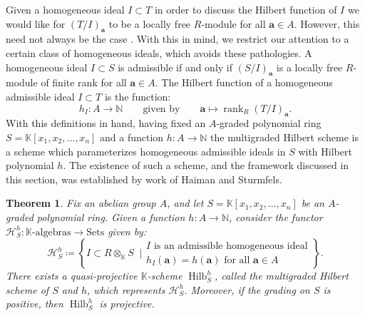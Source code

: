 \documentclass[11pt,reqno]{amsart}
\newtheorem{theorem}[lemma]{Theorem}
\newtheorem{defn}[lemma]{Definition}
\theoremstyle{remark}
\newtheorem{example}[lemma]{Example}
\newcommand{\Hilb}{\operatorname{Hilb}}
\newcommand{\rank}{\operatorname{rank}}
\renewcommand{\aa}{\mathbf a}
\newcommand{\cH}{\mathcal{H}}
\newcommand{\C}{\mathbb{C}}
\newcommand{\K}{\mathbb{K}}
\newcommand{\N}{\mathbb{N}}
\newcommand{\juliette}[1]{{\color{red} \sf $\spadesuit\spadesuit\spadesuit$ Juliette: [#1]}}
\begin{document}
Given a homogeneous ideal $I\subset T$ in order to discuss the Hilbert function of $I$ we would like for $(T/I)_{\aa}$ to be a locally free $R$-module for all $\aa\in A$. However, this need not always be the case \cite[Section~18.5]{millerSturmfels05}. With this in mind, we restrict our attention to a certain class of homogeneous ideals, which avoids these pathologies. A homogeneous ideal $I\subset S$ is admissible if and only if $(S/I)_{\aa}$ is a locally free $R$-module of finite rank for all $\aa\in A$. The Hilbert function of a homogeneous admissible ideal $I\subset T$ is the function:
\[
h_{I}:A\to \N \quad \quad \text{given by} \quad \quad \aa \mapsto \rank_{R} (T/I)_{\aa}.
\]
With this definitions in hand, having fixed an $A$-graded polynomial ring $S=\K[x_{1},x_{2},\ldots,x_{n}]$ and a function $h:A\to\N$ the multigraded Hilbert scheme is a scheme which parameterizes homogeneous admissible ideals in $S$ with Hilbert polynomial $h$. The existence of such a scheme, and the framework discussed in this section, was established by work of Haiman and Sturmfels. 

\begin{theorem}\cite{haimanSturmfels04}
Fix an abelian group $A$, and let $S=\K[x_{1},x_{2},\ldots,x_{n}]$ be an $A$-graded polynomial ring. Given a function $h:A\to \N$, consider the functor $\cH^{h}_{S}:\text{$\K$-algebras}\to \text{Sets}$ given by:
\[
\cH_{S}^{h}\coloneqq \left\{ I\subset R\otimes_{\K}S \;\; \big| \begin{matrix}
	\text{$I$ is an admissible homogeneous ideal} \\
	\text{$h_{I}(\aa) = h(\aa)$ for all $\aa\in A$}
\end{matrix}
\right\}.
\]
There exists a quasi-projective $\K$-scheme $\Hilb_{S}^{h}$, called the multigraded Hilbert scheme of $S$ and $h$, which represents $\cH_{S}^{h}$. Moreover, if the grading on $S$ is positive, then $\Hilb_{S}^{h}$ is projective.
\end{theorem}


\end{document}
